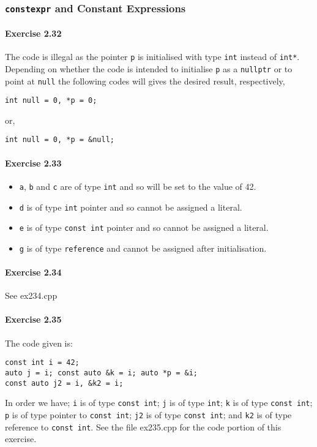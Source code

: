 \subsubsection{\texttt{constexpr} and Constant Expressions}

\paragraph{Exercise 2.32}
The code is illegal as the pointer \texttt{p} is initialised with type \texttt{int} instead of \texttt{int*}. Depending on whether the code is intended to initialise \texttt{p} as a \texttt{nullptr} or to point at \texttt{null} the following codes will gives the desired result, respectively,
\begin{center}
	\texttt{int null = 0, *p = 0;}
\end{center}
or,
\begin{center}
	\texttt{int null = 0, *p = \&null;}
\end{center}

\paragraph{Exercise 2.33}
\begin{itemize}
	\item 
		\texttt{a}, \texttt{b} and \texttt{c} are of type \texttt{int} and so will be set to the value of 42.
	\item 
		\texttt{d} is of type \texttt{int} pointer and so cannot be assigned a literal.
	\item 
		\texttt{e} is of type \texttt{const int} pointer and so cannot be assigned a literal.
	\item 
		\texttt{g} is of type \texttt{reference} and cannot be assigned after initialisation.
\end{itemize}

\paragraph{Exercise 2.34}
See ex234.cpp

\paragraph{Exercise 2.35}
The code given is:
\begin{flushleft}
		\texttt{const int i = 42;}\\
		\texttt{auto j = i; const auto \&k = i; auto *p = \&i;}\\
		\texttt{const auto j2 = i, \&k2 = i;}
\end{flushleft}
In order we have; \texttt{i} is of type \texttt{const int}; \texttt{j} is of type \texttt{int}; \texttt{k} is of type \texttt{const int}; \texttt{p} is of type pointer to \texttt{const int}; \texttt{j2} is of type \texttt{const int}; and \texttt{k2} is of type reference to \texttt{const int}. See the file ex235.cpp for the code portion of this exercise.
